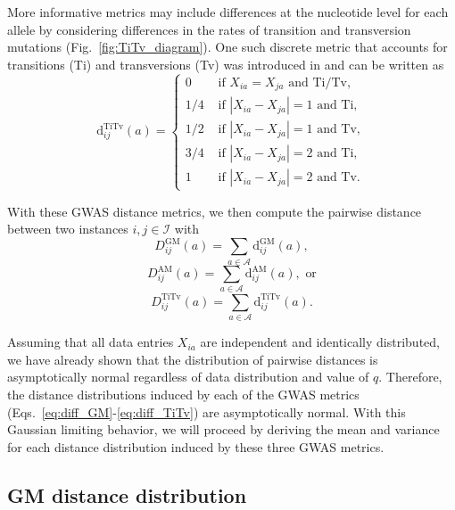 \documentclass[10pt,letterpaper]{article}
\begin{document}
More informative metrics may include differences at the nucleotide level for each allele by considering differences in the rates of transition and transversion mutations (Fig.~\ref{fig:TiTv_diagram}). One such discrete metric that accounts for transitions (Ti) and transversions (Tv) was introduced in \cite{arabnejad2018} and can be written as
%
\begin{equation}\label{eq:diff_TiTv}
\text{d}^\text{TiTv}_{ij}(a) = \begin{cases}
0 & \text{ if } X_{ia} = X_{ja} \text{ and Ti/Tv}, \\
1/4 & \text{ if } |X_{ia} - X_{ja}|=1 \text{ and Ti}, \\
1/2 & \text{ if } |X_{ia} - X_{ja}|=1 \text{ and Tv}, \\
3/4 & \text{ if } |X_{ia} - X_{ja}|=2 \text{ and Ti}, \\
1 & \text{ if } |X_{ia} - X_{ja}|=2 \text{ and Tv}.
\end{cases}
\end{equation}

With these GWAS distance metrics, we then compute the pairwise distance between two instances $i,j \in \mathcal{I}$ with
%
\begin{equation}\label{eq:D_GM}
D^\text{GM}_{ij}(a) = \sum_{a \in \mathcal{A}} \text{d}^\text{GM}_{ij}(a),
\end{equation}
%
\begin{equation}\label{eq:D_AM}
D^\text{AM}_{ij}(a) = \sum_{a \in \mathcal{A}} \text{d}^\text{AM}_{ij}(a), \text{ or}
\end{equation}
%
\begin{equation}\label{eq:D_TiTv}
D^\text{TiTv}_{ij}(a) = \sum_{a \in \mathcal{A}} \text{d}^\text{TiTv}_{ij}(a).
\end{equation}

Assuming that all data entries $X_{ia}$ are independent and identically distributed, we have already shown that the distribution of pairwise distances is asymptotically normal regardless of data distribution and value of $q$. Therefore, the distance distributions induced by each of the GWAS metrics (Eqs.~\ref{eq:diff_GM}-\ref{eq:diff_TiTv}) are asymptotically normal. With this Gaussian limiting behavior, we will proceed by deriving the mean and variance for each distance distribution induced by these three GWAS metrics. 

\subsection*{GM distance distribution}
\end{document}
